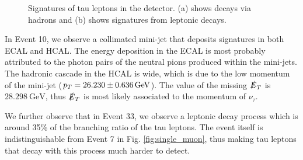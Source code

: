 \documentclass[a4paper]{report}
\numberwithin{equation}{section}
\begin{document}
\begin{figure}[htb!]
	\centering
	\quad
	\centering
	\caption{Signatures of tau leptons in the detector. (a) shows decays via hadrons and (b) shows signatures from leptonic decays.}
	\label{fig:single_tau}
\end{figure}

In Event 10, we observe a collimated mini-jet that deposits signatures in both ECAL and HCAL. The energy deposition in the ECAL is 
most probably attributed to the photon pairs of the neutral pions produced within the mini-jets. The hadronic cascade in the HCAL is 
wide, which is due to the low momentum of the mini-jet ($ p_T = \SI{26.23 \pm 0.636}{\giga\electronvolt}$). The value of the missing 
$\slashed{E}_T$ is $\SI{ 28.298}{\giga\electronvolt}$, thus $\slashed{E}_T$ is most likely associated to the momentum of $\nu_\tau$. \par 

We further observe that in Event 33, we observe a leptonic decay process which is around 35\% of the branching ratio of 
the tau leptons. The event itself is indistinguishable from Event 7 in Fig. \ref{fig:single_muon}, thus making tau leptons that decay 
with this process much harder to detect. 
\end{document}
